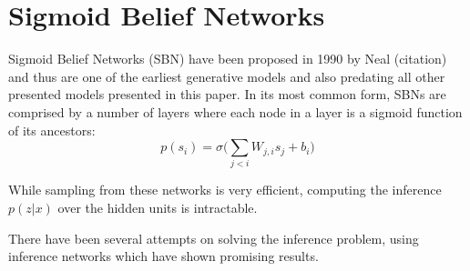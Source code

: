 \section{Sigmoid Belief Networks}
\label{sec:sbn}
Sigmoid Belief Networks (SBN) have been proposed in 1990 by Neal (citation) and thus are one of the earliest generative models and also predating all other presented models presented in this paper.
In its most common form, SBNs are comprised by a number of layers where each node in a layer is a sigmoid function of its ancestors:
$$
p(s_i) = \sigma\bigg(\sum_{j<i}W_{j,i}s_j+b_i\bigg)
$$

While sampling from these networks is very efficient, computing the inference $p(z|x)$ over the hidden units is intractable.

There have been several attempts on solving the inference problem, using inference networks which have shown promising results.


